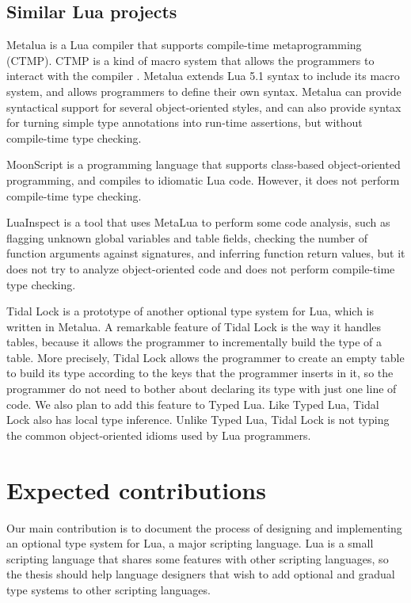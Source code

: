 \documentclass[preprint]{sig-alternate}
\begin{document}
\subsection{Similar Lua projects}

Metalua \cite{metalua} is a Lua compiler that supports compile-time
metaprogramming (CTMP).
CTMP is a kind of macro system that allows the programmers to interact
with the compiler \cite{fleutot2007contrasting}. 
Metalua extends Lua 5.1 syntax to include its macro system,
and allows programmers to define their own syntax.
Metalua can provide syntactical support for several object-oriented
styles, and can also provide syntax for turning simple type
annotations into run-time assertions, but without compile-time type
checking.

MoonScript \cite{moonscript} is a programming language that supports
class-based object-oriented programming, and compiles to idiomatic
Lua code.
However, it does not perform compile-time type checking.

LuaInspect \cite{luainspect} is a tool that uses MetaLua to perform
some code analysis, such as flagging unknown global variables and
table fields, checking the number of function arguments against
signatures, and inferring function return values, but it does not
try to analyze object-oriented code and does not perform compile-time
type checking.

Tidal Lock \cite{tidallock} is a prototype of another optional type
system for Lua, which is written in Metalua.
A remarkable feature of Tidal Lock is the way it handles tables,
because it allows the programmer to incrementally build the type of
a table.
More precisely, Tidal Lock allows the programmer to create an empty
table to build its type according to the keys that the programmer
inserts in it, so the programmer do not need to bother about declaring
its type with just one line of code.
We also plan to add this feature to Typed Lua.
Like Typed Lua, Tidal Lock also has local type inference.
Unlike Typed Lua, Tidal Lock is not typing the common object-oriented
idioms used by Lua programmers.

\section{Expected contributions} \label{sec:con}

Our main contribution is to document the process of designing and
implementing an optional type system for Lua, a major scripting
language.
Lua is a small scripting language that shares some features with other
scripting languages, so the thesis should help language designers
that wish to add optional and gradual type systems to other
scripting languages.
\end{document}

